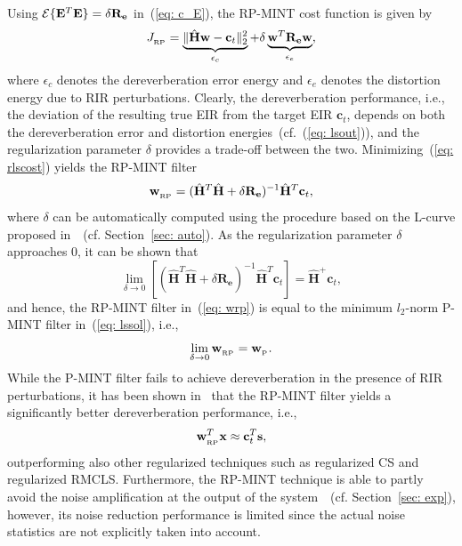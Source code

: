 \documentclass[draftcls,onecolumn,11pt]{IEEEtran}
\begin{document}
Using ${\cal{E}}\{ \mathbf{E}^T \mathbf{E} \} = \delta \mathbf{R}_{\mathbf{e}}$ in~(\ref{eq: c_E}), the RP-MINT cost function is given by~\cite{Kodrasi_ITASLP_2013}
\begin{equation}
  \label{eq: rlscost}
  J_{_{\rm RP}} =  \underbrace{\| \hat{\mathbf{H}}\mathbf{w} - \mathbf{c}_t \|_2^2}_{\epsilon_{{c}}} + \delta \underbrace{ \mathbf{w}^T \mathbf{R}_{\mathbf{e}} \mathbf{w} }_{\epsilon_e},
\end{equation}
where $\epsilon_{{c}}$ denotes the dereverberation error energy and $\epsilon_{e}$ denotes the distortion energy due to RIR perturbations.
Clearly, the dereverberation performance, i.e., the deviation of the resulting true EIR from the target EIR $\mathbf{c}_t$, depends on both the dereverberation error and distortion energies~(cf.~(\ref{eq: lsout})), and the regularization parameter $\delta$ provides a trade-off between the two.
Minimizing~(\ref{eq: rlscost}) yields the RP-MINT filter
\begin{equation}
\label{eq: wrp}
\mathbf{w}_{_{\rm RP}} = (\hat{\mathbf{H}}^T\hat{\mathbf{H}} + \delta \mathbf{R}_{\mathbf{e}})^{-1}\hat{\mathbf{H}}^T\mathbf{c}_t,
\end{equation}
where $\delta$ can be automatically computed using the procedure based on the L-curve proposed in~\cite{Kodrasi_ITASLP_2013}~(cf. Section~\ref{sec: auto}).
As the regularization parameter $\delta$ approaches $0$, it can be shown that
\begin{equation}
\label{eq: hreg_h}
\lim_{\delta \rightarrow 0} \left[ (\hat{\mathbf{H}}^T\hat{\mathbf{H}} + \delta \mathbf{R}_{\mathbf{e}})^{-1}\hat{\mathbf{H}}^T \mathbf{c}_t \right] = \hat{\mathbf{H}}^+\mathbf{c}_t,
\end{equation}
and hence, the RP-MINT filter in~(\ref{eq: wrp}) is equal to the minimum $l_2$-norm P-MINT filter in~(\ref{eq: lssol}), i.e., 
\begin{equation}
\lim_{\delta \rightarrow 0} \mathbf{w}_{_{\rm RP}} = \mathbf{w}_{_{\rm P}}.
\end{equation}
While the P-MINT filter fails to achieve dereverberation in the presence of RIR perturbations, it has been shown in~\cite{Kodrasi_ITASLP_2013} that the RP-MINT filter yields a significantly better dereverberation performance, i.e., 
\begin{equation}
\label{eq: rpperfect}
\mathbf{w}_{_{\rm RP}}^T\mathbf{x} \approx  \mathbf{c}_t^T \mathbf{s},
\end{equation}
outperforming also other regularized techniques such as regularized CS and regularized RMCLS.
Furthermore, the RP-MINT technique is able to partly avoid the noise amplification at the output of the system~\cite{Kodrasi_ITASLP_2013}~(cf. Section~\ref{sec: exp}), however, its noise reduction performance is limited since the actual noise statistics are not explicitly taken into account. 
\end{document}
